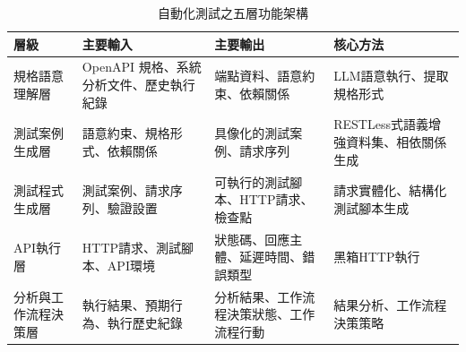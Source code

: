 \begin{ZhChapter}
\begin{table}[H]
    \centering
    \caption{自動化測試之五層功能架構}
    \label{tab:five_layer_architecture}
    \scriptsize
    \renewcommand{\arraystretch}{1.4}
    \begin{tabularx}{\textwidth}{>{\raggedright\arraybackslash}p{2.7cm} >{\raggedright\arraybackslash}X >{\raggedright\arraybackslash}X >{\raggedright\arraybackslash}p{2.8cm}}
        \toprule
        \textbf{層級} & \textbf{主要輸入} & \textbf{主要輸出} & \textbf{核心方法} \\
        \midrule
        規格語意理解層 & OpenAPI 規格、系統分析文件、歷史執行紀錄 & 端點資料、語意約束、依賴關係 & LLM語意執行、提取規格形式 \\
        測試案例生成層 & 語意約束、規格形式、依賴關係 & 具像化的測試案例、請求序列 & RESTLess式語義增強資料集、相依關係生成 \\
        測試程式生成層 & 測試案例、請求序列、驗證設置 & 可執行的測試腳本、HTTP請求、檢查點 & 請求實體化、結構化測試腳本生成 \\
        API執行層 & HTTP請求、測試腳本、API環境 & 狀態碼、回應主體、延遲時間、錯誤類型 & 黑箱HTTP執行 \\
        分析與工作流程決策層 & 執行結果、預期行為、執行歷史紀錄 & 分析結果、工作流程決策狀態、工作流程行動 & 結果分析、工作流程決策策略 \\
        \bottomrule
    \end{tabularx}
\end{table}


\end{ZhChapter}
